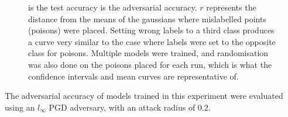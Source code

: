 \documentclass{ociamthesis}
\begin{document}
\begin{figure}[!h]
    \centering
    \qquad
    \caption{ is the
    test accuracy  is the
    adversarial accuracy. $r$ represents the distance from the means of the
    gaussians where mislabelled points (poisons) were placed. Setting wrong
    labels to a third class produces a curve very similar to the case where
    labels were set to the opposite class for poisons. Multiple models were
    trained, and randomisation was also done on the poisons placed for each run,
    which is what the confidence intervals and mean curves are representative
    of.}
    \label{fig:far-gaussian-curve}
\end{figure}

The adversarial accuracy of models trained in this experiment were evaluated
using an $l_\infty$ PGD adversary, with an attack radius of 0.2.
\end{document}
